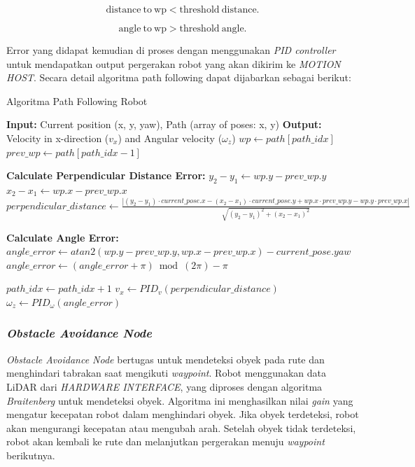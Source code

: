 \begin{equation}
  \label{eq:condition_distance}
  \mathrm{distance\ to\ wp} < \mathrm{threshold\ distance}.
\end{equation}

\begin{equation}
  \label{eq:condition_angle}
  \mathrm{angle\ to\ wp} > \mathrm{threshold\ angle}.
\end{equation}

Error yang didapat kemudian di proses dengan menggunakan \emph{PID controller} untuk mendapatkan output pergerakan robot yang akan dikirim ke \emph{MOTION HOST}. Secara detail algoritma path following dapat dijabarkan sebagai berikut:

\begin{algorithm}
  \caption{Algoritma Path Following Robot}
  \begin{algorithmic}[1]
  \State \textbf{Input:} Current position (x, y, yaw), Path (array of poses: x, y)
  \State \textbf{Output:} Velocity in x-direction ($v_x$) and Angular velocity ($\omega_z$)
      \State $wp \gets path[path\_idx]$
      \State $prev\_wp \gets path[path\_idx - 1]$
      
      \State \textbf{Calculate Perpendicular Distance Error:}
      \State $y_2 - y_1 \gets wp.y - prev\_wp.y$
      \State $x_2 - x_1 \gets wp.x - prev\_wp.x$
      \State $perpendicular\_distance \gets \frac{|(y_2 - y_1) \cdot current\_pose.x - (x_2 - x_1) \cdot current\_pose.y + wp.x \cdot prev\_wp.y - wp.y \cdot prev\_wp.x|}{\sqrt{(y_2 - y_1)^2 + (x_2 - x_1)^2}}$
      
      \State \textbf{Calculate Angle Error:}
      \State $angle\_error \gets atan2(wp.y - prev\_wp.y, wp.x - prev\_wp.x) - current\_pose.yaw$
      \State $angle\_error \gets (angle\_error + \pi) \bmod (2\pi) - \pi$ 


          \State $path\_idx \gets path\_idx + 1$
      \Else
          \State $v_x \gets PID_v (perpendicular\_distance)$
          \State $\omega_z \gets PID_\omega (angle\_error)$
      \EndIf
  \EndWhile
  \end{algorithmic}
\end{algorithm}

\subsubsection{\emph{Obstacle Avoidance Node}}
\emph{Obstacle Avoidance Node} bertugas untuk mendeteksi obyek pada rute dan menghindari tabrakan saat mengikuti \emph{waypoint}. Robot menggunakan data LiDAR dari \emph{HARDWARE INTERFACE}, yang diproses dengan algoritma \emph{Braitenberg} untuk mendeteksi obyek. Algoritma ini menghasilkan nilai \emph{gain} yang mengatur kecepatan robot dalam menghindari obyek. Jika obyek terdeteksi, robot akan mengurangi kecepatan atau mengubah arah. Setelah obyek tidak terdeteksi, robot akan kembali ke rute dan melanjutkan pergerakan menuju \emph{waypoint} berikutnya.

